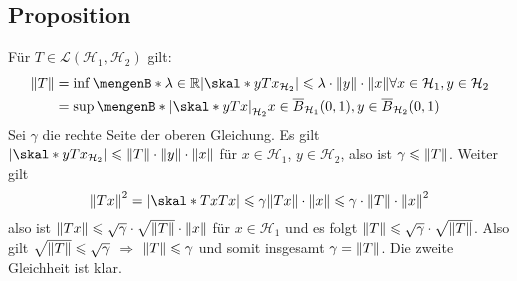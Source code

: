 \subsection{Proposition} %
\label{sub:726}
Für $T \in \mathcal{L}(\mathcal{H}_1, \mathcal{H}_2)$ gilt: 
\begin{align*}
	\norm{T} &= \inf \set[\lambda \in \mathds{R}]{ \abs*{\skal*{y}{T x}_{\mathcal{H}_2}} \le \lambda \cdot \norm{y} \cdot \norm{x} \forall x \in \mathcal{H}_1, y \in \mathcal{H}_2}  \\
	&= \sup \set[\abs*{\skal*{y}{T x}}_{\mathcal{H}_2}]{ x \in \overline{B}_{\mathcal{H}_1}(0,1), y \in \overline{B}_{\mathcal{H}_2}(0,1)} 
\end{align*}
Sei $\gamma$ die rechte Seite der oberen Gleichung.
Es gilt $\abs*{\skal*{y}{Tx}_{\mathcal{H}_2}} \le \norm{T} \cdot \norm{y} \cdot \norm{x}$ für $x \in \mathcal{H}_1$, $y \in \mathcal{H}_2$, also ist 
$\gamma \le \norm{T}$. Weiter gilt 
\[
	\norm{T x}^2 = \abs*{\skal*{T x}{T x}} \le \gamma \norm{T x} \cdot \norm{x} \le \gamma \cdot \norm{T} \cdot \norm{x}^2
\]
also ist $\norm{T x} \le \sqrt{\gamma} \cdot \sqrt{\norm{T}} \cdot \norm{x}$ für $x \in \mathcal{H}_1$ und es folgt $\norm{T} \le \sqrt{\gamma} \cdot \sqrt{\norm{T}}$. Also
gilt $\sqrt{\norm{T}} \le \sqrt{\gamma}$ $\Rightarrow $ $\norm{T} \le \gamma$ und somit insgesamt $\gamma = \norm{T}$.
Die zweite Gleichheit ist klar. \bewende


